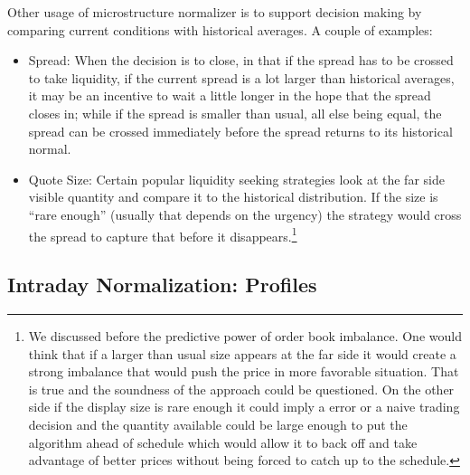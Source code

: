 Other usage of microstructure normalizer is to support decision making by comparing current conditions with historical averages. A couple of examples:
        \begin{itemize}
        \item Spread: When the decision is to close, in that if the spread has to be crossed to take liquidity, if the current spread is a lot larger than historical averages, it may be an incentive to wait a little longer in the hope that the spread closes in; while if the spread is smaller than usual, all else being equal, the spread can be crossed immediately before the spread returns to its historical normal.
        \item Quote Size: Certain popular liquidity seeking strategies look at the far side visible quantity and compare it to the historical distribution. If the size is ``rare enough'' (usually that depends on the urgency) the strategy would  cross the spread to capture that before it disappears.\footnote{We discussed before the predictive power of order book imbalance. One would think that if a larger than usual size appears at the far side it would create a strong imbalance that would push the price in more favorable situation. That is true and the soundness of the approach could be questioned. On the other side if the display size is rare enough it could imply a error or a naive trading decision and the quantity available could be large enough to put the algorithm ahead of schedule which would allow it to back off and take advantage of better prices without being forced to catch up to the schedule.}
        \end{itemize}



\subsection{Intraday Normalization: Profiles \label{s:profiles}}

